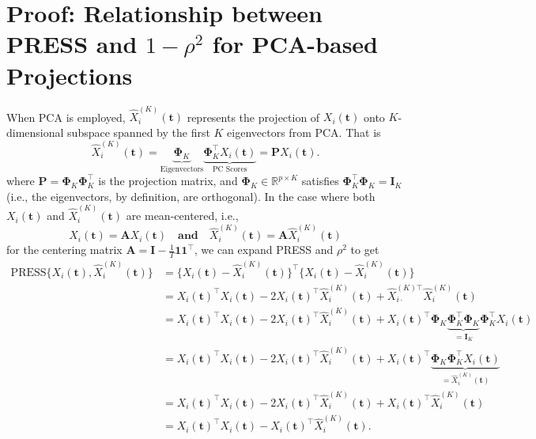 \section*{Proof: Relationship between PRESS and $1 -\rho^2$ for PCA-based Projections}

When PCA is employed, $\widehat{X}^{(K)}_{i}(\mathbf{t})$ represents the projection of $X_{i}(\mathbf{t})$ onto \( K \)-dimensional subspace spanned by the first $K$ eigenvectors from PCA. That is
$$
 \widehat{X}^{(K)}_{i} (\mathbf{t}) = \underbrace{\boldsymbol{\Phi}_K}_{\text{Eigenvectors}} \underbrace{\boldsymbol{\Phi}_K^\top X_i(\mathbf{t})}_{\text{PC Scores}}
 = \mathbf{P} X_i(\mathbf{t}).
$$
where \( \mathbf{P} = \bm{\Phi}_K \bm{\Phi}_K^\top \) is the projection matrix, and \( \bm{\Phi}_K \in \mathbb{R}^{p \times K} \) satisfies \( \bm{\Phi}_K^\top \bm{\Phi}_K = \mathbf{I}_K \) (i.e., the eigenvectors, by definition, are orthogonal).
In the case where both $X_i(\mathbf{t})$ and $\widehat{X}^{(K)}_{i}(\mathbf{t})$ are mean-centered, i.e.,
$$
    X_i(\mathbf{t}) = \mathbf{A} X_i(\mathbf{t})
 \quad \textbf{and} \quad 
 \widehat{X}^{(K)}_{i}(\mathbf{t}) = \mathbf{A}\widehat{X}^{(K)}_{i}(\mathbf{t})
$$
for the centering matrix \( \mathbf{A} = \mathbf{I} - \frac{1}{T} \mathbf{1} \mathbf{1}^\top \), we can expand PRESS and $\rho^2$ to get
\begin{align*}
    \text{PRESS}\bigg\{X_{i}(\mathbf{t}),  \widehat{X}^{(K)}_{i} (\mathbf{t})\bigg\} &= \bigg\{X_{i}(\mathbf{t}) -  \widehat{X}^{(K)}_{i} (\mathbf{t})\bigg\}^\top \bigg\{X_{i}(\mathbf{t}) -  \widehat{X}^{(K)}_{i} (\mathbf{t})\bigg\} \\
    &= 
    X_{i}(\mathbf{t})^\top X_{i}(\mathbf{t}) - 2 X_{i}(\mathbf{t})^\top  \widehat{X}^{(K)}_{i} (\mathbf{t}) + \widehat{X}^{(K)\top}_{i\cdot}  \widehat{X}^{(K)}_{i} (\mathbf{t}) \\
    &= X_{i}(\mathbf{t})^\top X_{i}(\mathbf{t}) - 2 X_{i}(\mathbf{t})^\top  \widehat{X}^{(K)}_{i} (\mathbf{t}) + X_{i}(\mathbf{t})^\top \boldsymbol{\Phi}_K \underbrace{\boldsymbol{\Phi}_K^\top \boldsymbol{\Phi}_K}_{= \mathbf{I}_K} \boldsymbol{\Phi}_K^\top X_{i}(\mathbf{t}) \\
    &=  X_{i}(\mathbf{t})^\top X_{i}(\mathbf{t}) - 2 X_{i}(\mathbf{t})^\top  \widehat{X}^{(K)}_{i} (\mathbf{t}) + X_{i}(\mathbf{t})^\top \underbrace{\boldsymbol{\Phi}_K \boldsymbol{\Phi}_K^\top X_{i}(\mathbf{t})}_{= \widehat{X}^{(K)}_{i} (\mathbf{t})} \\
    &= X_{i}(\mathbf{t})^\top X_{i}(\mathbf{t}) - 2 X_{i}(\mathbf{t})^\top  \widehat{X}^{(K)}_{i} (\mathbf{t}) + X_{i}(\mathbf{t})^\top  \widehat{X}^{(K)}_{i} (\mathbf{t}) \\
    &= X_{i}(\mathbf{t})^\top X_{i}(\mathbf{t}) - X_{i}(\mathbf{t})^\top  \widehat{X}^{(K)}_{i} (\mathbf{t}).
\end{align*}
